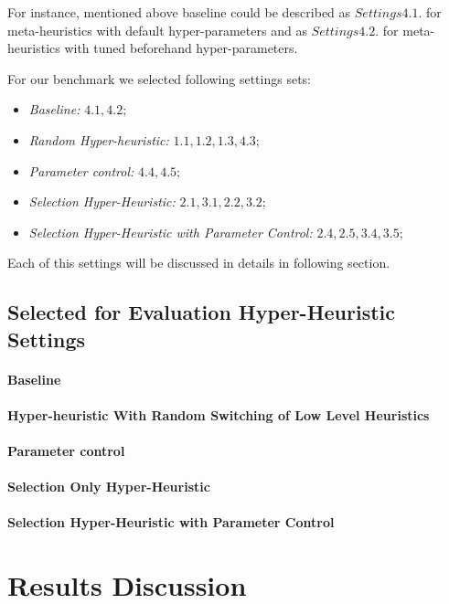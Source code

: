 For instance, mentioned above baseline could be described as $Settings 4.1.$ for meta-heuristics with default hyper-parameters and as $Settings 4.2.$ for meta-heuristics with tuned beforehand hyper-parameters.

For our benchmark we selected following settings sets:

\begin{itemize}
	\item \textit{Baseline:} $4.1, 4.2;$
	\item \textit{Random Hyper-heuristic:} $1.1, 1.2, 1.3, 4.3;$
	\item \textit{Parameter control:} $4.4, 4.5;$
	\item \textit{Selection Hyper-Heuristic:} $2.1, 3.1, 2.2, 3.2;$
	\item \textit{Selection Hyper-Heuristic with Parameter Control:} $2.4, 2.5, 3.4, 3.5;$
\end{itemize}

Each of this settings will be discussed in details in following section.


\subsection{Selected for Evaluation Hyper-Heuristic Settings}
\paragraph{Baseline}

\paragraph{Hyper-heuristic With Random Switching of Low Level Heuristics}

\paragraph{Parameter control}

\paragraph{Selection Only Hyper-Heuristic}

\paragraph{Selection Hyper-Heuristic with Parameter Control}


\section{Results Discussion}

